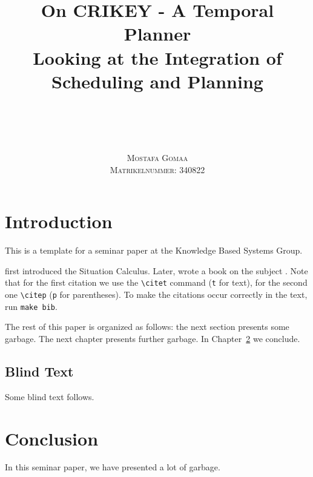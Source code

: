 \documentclass
[a4paper
,english
,parskip=half
,bibliography=totoc
]{scrreprt}
\title{
    On CRIKEY - A Temporal Planner\\ 
    Looking at the Integration of\\
    Scheduling and Planning
}
\author{
    \\
    \\
    \\
    \\
    \scshape Mostafa Gomaa\\
    \scshape \small Matrikelnummer: 340822
}
\date{}
\begin{document}
\pagestyle{useheadings}
\maketitle
\tableofcontents
\cleardoublepage
\pagestyle{scrheadings}


\chapter{Introduction}

This is a template for a seminar paper at the Knowledge Based Systems Group.

\citet{McCarthy1963} first introduced the Situation Calculus.
Later, \citeauthor{Reiter:KIA} wrote a book on the subject \citep{Reiter:KIA}.
Note that for the first citation we use the \verb+\citet+ command (\texttt{t}
for text), for the second one \verb+\citep+ (\texttt{p} for parentheses).
To make the \BibTeX{} citations occur correctly in the text, run
\verb+make bib+.

The rest of this paper is organized as follows:
the next section presents some garbage.
The next chapter presents further garbage.
In Chapter~\ref{conclusion} we conclude.


\section{Blind Text}

Some blind text follows.

\Blindtext


\Blinddocument


\chapter{Conclusion} \label{conclusion}

In this seminar paper, we have presented a lot of garbage.





\end{document}
